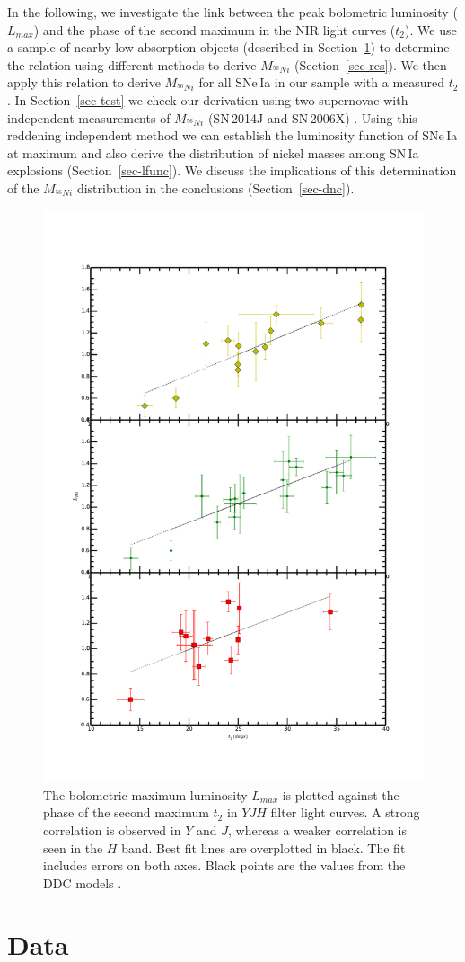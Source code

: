 \documentclass[traditabstract]{aa}
\begin{document}
In the following, we investigate the link between the peak bolometric luminosity ($L_{max}$) and the phase of the second maximum in the NIR light curves ($t_2$). We use a sample of nearby low-absorption objects (described in Section~\ref{sec-data}) to determine the relation using different methods to derive $M_{^{56}Ni}$ (Section~\ref{sec-res}). We then apply this relation to derive $M_{^{56}Ni}$ for all SNe\,Ia in our sample with a measured $t_2$. In Section~\ref{sec-test} we check our derivation using two supernovae with independent measurements of $M_{^{56}Ni}$ (SN\,2014J  and SN\,2006X) . Using this reddening independent method we can establish the luminosity function of SNe\,Ia at maximum and also derive the distribution of nickel masses among SN\,Ia explosions (Section~\ref{sec-lfunc}). We discuss the implications of this determination of the $M_{^{56}Ni}$ distribution in the conclusions (Section~\ref{sec-dnc}).

\begin{figure}
\centering
\includegraphics[width=.50\textwidth, height=0.6\textheight]{lbolt2_bf.pdf}
\caption{The bolometric maximum luminosity $L_{max}$ is plotted against the phase of the second maximum $t_2$ in $YJH$ filter light curves. A strong correlation is observed in  $Y$ and $J$, whereas a weaker correlation is seen in the $H$ band.  Best fit lines are overplotted in black. The fit includes errors on both axes. Black points are the values from the DDC models \citep{Blondin2013}.}
\label{fig:nit2}
\end{figure}


\section{Data} 
\label{sec-data}
\end{document}

